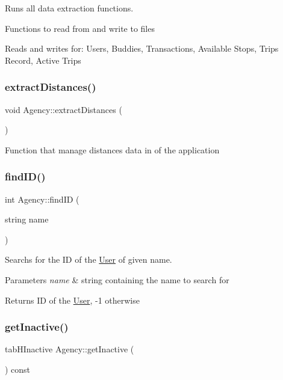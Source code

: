 Runs all data extraction functions. 

Functions to read from and write to files

Reads and writes for\+: Users, Buddies, Transactions, Available Stops, Trips Record, Active Trips \mbox{\label{group___agency_gab893f05c69379631019010af71052595}} 
\subsubsection{\texorpdfstring{extract\+Distances()}{extractDistances()}}
{\footnotesize\ttfamily void Agency\+::extract\+Distances (\begin{DoxyParamCaption}{ }\end{DoxyParamCaption})}

Function that manage distances data in of the application \mbox{\label{group___agency_gab129c30ae0ba6c735d0f600c1b00894d}} 
\subsubsection{\texorpdfstring{find\+I\+D()}{findID()}}
{\footnotesize\ttfamily int Agency\+::find\+ID (\begin{DoxyParamCaption}\item[{string}]{name }\end{DoxyParamCaption})}



Searchs for the ID of the \hyperlink{class_user}{User} of given name. 


\begin{DoxyParams}{Parameters}
{\em name} & string containing the name to search for\\
\hline
\end{DoxyParams}
\begin{DoxyReturn}{Returns}
ID of the \hyperlink{class_user}{User}, -\/1 otherwise 
\end{DoxyReturn}
\mbox{\label{group___agency_ga6e06b2cf396c6d41ed4d5e2f215a3035}} 
\subsubsection{\texorpdfstring{get\+Inactive()}{getInactive()}}
{\footnotesize\ttfamily tab\+H\+Inactive Agency\+::get\+Inactive (\begin{DoxyParamCaption}{ }\end{DoxyParamCaption}) const}



